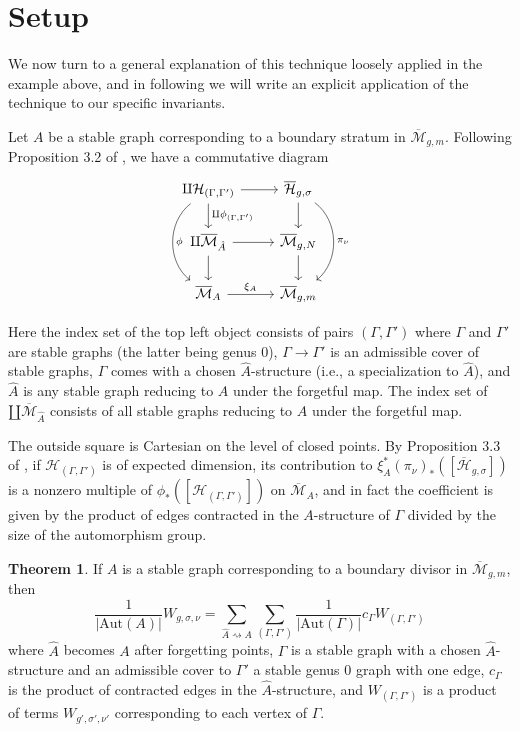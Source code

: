\documentclass[thesis]{thesis-umich}           %
\newcommand{\mb}{\overline{\mathcal M}}
\newcommand{\Aut}{\text{Aut}}
\newcommand{\Hb}{\overline{\mathcal H}}
\theoremstyle{definition}
\newtheorem{thm}{Theorem}[section]
\begin{document}
                \section{Setup}

                We now turn to a general explanation of this technique loosely applied in the example above, and in following \cite{Generalized} we will write an explicit application of the technique to our specific invariants.
                


Let $A$ be a stable graph
corresponding to a boundary stratum in $\mb_{g,m}$.
Following Proposition 3.2 of \cite{Lian}, we have a commutative diagram
\[\begin{tikzcd}
\amalg \mathcal H_{(\Gamma,\Gamma')} & \Hb_{g,\sigma} \\
\amalg \mb_{\hat A} & \mb_{g,N} \\
	\mb_A & \mb_{g,m}
	\arrow[from=1-1, to=1-2]
	\arrow[from=1-1, to=2-1, "\amalg \phi_{(\Gamma,\Gamma')}"]
        \arrow[from=2-1, to=3-1]
	\arrow[from=1-2, to=2-2]
	\arrow[from=2-1, to=2-2]
        \arrow[from=2-2, to=3-2]
        \arrow[from=3-1, to=3-2, "\xi_A"]
        \arrow[from=1-2, to=3-2, bend left=52, "\pi_{\nu}"]
        \arrow[from=1-1, to=3-1, bend  right=52, "\phi"]
\end{tikzcd}\]

Here the index set of the top left object
consists of pairs $(\Gamma,\Gamma')$
where $\Gamma$ and $\Gamma'$ are stable graphs (the latter being genus $0$), $\Gamma\to\Gamma'$ is an admissible cover of stable graphs, $\Gamma$
comes with a chosen $\hat A$-structure (i.e., a specialization to $\hat A$),
and $\hat A$ is any stable graph reducing to $A$ under the forgetful map.
The index set of $\amalg\overline{\mathcal M}_{\hat A}$ consists of
all stable graphs reducing to $A$ under the forgetful map.

The outside square is Cartesian on the level of closed points. By
Proposition 3.3 of \cite{Lian}, if $\mathcal H_{(\Gamma,\Gamma')}$ is of
expected dimension, its contribution to $\xi_A^*(\pi_{\nu})_*([\Hb_{g,\sigma}])$
is a nonzero multiple of $\phi_*([\mathcal H_{(\Gamma,\Gamma')}])$ on $\overline{\mathcal M}_A$, and in fact the coefficient is given by the product of edges contracted in the $A$-structure of $\Gamma$ divided by the size of the automorphism group.%

\begin{thm}
  \label{thm:admissible}
  If $A$ is a stable graph corresponding to a boundary divisor in $\mb_{g,m}$, then
  \[
  \frac 1{|\Aut(A)|}W_{g,\sigma,\nu}=\sum_{\hat A\rightsquigarrow A}\sum_{(\Gamma,\Gamma')}\frac 1{|\Aut(\Gamma)|}c_{\Gamma}W_{(\Gamma,\Gamma')}
  \]
  where $\hat A$ becomes $A$ after forgetting points, $\Gamma$ is a stable graph with a chosen $\hat A$-structure and an admissible
  cover to $\Gamma'$ a stable genus $0$ graph with one edge, $c_{\Gamma}$ is the
  product of contracted edges in the $\hat A$-structure, and
  $W_{(\Gamma,\Gamma')}$ is a product of terms $W_{g',\sigma',\nu'}$ corresponding to each vertex of $\Gamma$.
\end{thm}
\end{document}
